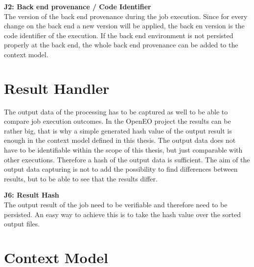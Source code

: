 \documentclass[draft,final]{vutinfth} %
\begin{document}
\textbf{J2: Back end provenance / Code Identifier} \\
The version of the back end provenance during the job execution. Since for every change on the back end a new version will be applied, the back en version is the code identifier of the execution. If the back end environment is not persisted properly at the back end, the whole back end provenance can be added to the context model.  


\section{Result Handler}\label{Design:Result Handler}
The output data of the processing has to be captured as well to be able to compare job execution outcomes. In the OpenEO project the results can be rather big, that is why a simple generated hash value of the output result is enough in the context model defined in this thesis. The output data does not have to be identifiable within the scope of this thesis, but just comparable with other executions. Therefore a hash of the output data is sufficient. The aim of the output data capturing is not to add the possibility to find differences between results, but to be able to see that the results differ. 

\textbf{J6: Result Hash} \\
The output result of the job need to be verifiable and therefore need to be persisted. An easy way to achieve this is to take the hash value over the sorted output files.
 
\section{Context Model}\label{Design:Context Model}
\end{document}
